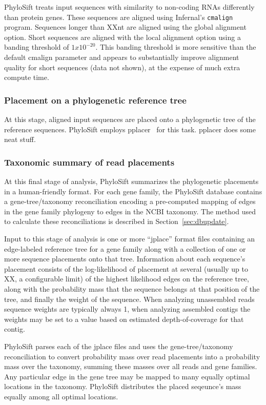 \documentclass[10pt]{article}
\begin{document}
PhyloSift treats input sequences with similarity to non-coding RNAs differently than protein genes.
These sequences are aligned using Infernal's \texttt{cmalign} program.
Sequences longer than XXnt are aligned using the global alignment option.
Short sequences are aligned with the local alignment option using a banding threshold of $1x10^{-20}$.
This banding threshold is more sensitive than the default cmalign parameter and appears to substantially improve alignment quality for short sequences (data not shown), at the expense of much extra compute time.

\subsubsection*{Placement on a phylogenetic reference tree}

At this stage, aligned input sequences are placed onto a phylogenetic tree of the reference sequences.
PhyloSift employs pplacer~\cite{Matsen2010} for this task.
pplacer does some neat stuff.


\subsubsection*{Taxonomic summary of read placements}
At this final stage of analysis, PhyloSift summarizes the phylogenetic placements in a human-friendly format.
For each gene family, the PhyloSift database contains a gene-tree/taxonomy reconciliation encoding a pre-computed mapping of edges in the gene family phylogeny to edges in the NCBI taxonomy.
The method used to calculate these reconciliations is described in Section~\ref{sec:dbupdate}.

Input to this stage of analysis is one or more ``jplace'' format files containing an edge-labeled reference tree for a gene family along with a collection of one or more sequence placements onto that tree.
Information about each sequence's placement consists of the log-likelihood of placement at several (usually up to XX, a configurable limit) of the highest likelihood edges on the reference tree, along with the probability mass that the sequence belongs at that position of the tree, and finally the weight of the sequence. 
When analyzing unassembled reads sequence weights are typically always 1, when analyzing assembled contigs the weights may be set to a value based on estimated depth-of-coverage for that contig.

PhyloSift parses each of the jplace files and uses the gene-tree/taxonomy reconciliation to convert probability mass over read placements into a probability mass over the taxonomy, summing these masses over all reads and gene families.
Any particular edge in the gene tree may be mapped to many equally optimal locations in the taxonomy.
PhyloSift distributes the placed seqeunce's mass equally among all optimal locations.
\end{document}
